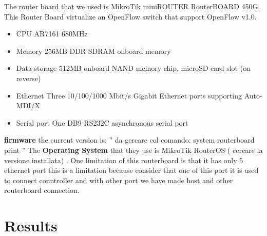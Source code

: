 \documentclass[conference,10pt]{IEEEtran}
\begin{document}
  The router board that we used is MikroTik miniROUTER RouterBOARD 450G. This Router Board virtualize an OpenFlow switch that support
  OpenFlow v1.0\cite{routerboard_doc}.
  \begin{itemize}
   \item CPU		AR7161 680MHz
   \item Memory		256MB DDR SDRAM onboard memory
   \item Data storage	512MB onboard NAND memory chip, microSD card slot (on reverse)
   \item Ethernet 	Three 10/100/1000 Mbit/s Gigabit Ethernet ports supporting Auto-MDI/X
   \item Serial port 	One DB9 RS232C asynchronous serial port
  \end{itemize}
  \textbf{firmware} the current version is: '' da gercare col comando: system routerboard print ''
  \newline
  The \textbf{Operating System} that they use is MikroTik RouterOS ( cercare la versione installata) \cite{routeboard_software}.
  \newline
  One limitation of this routerboard is that it has only 5 ethernet port this is a limitation because consider that one of this port it is
  used to connect conntroller and with other port we have made host and other routerboard connection.


\section{Results}\label{sec:results}
\end{document}
